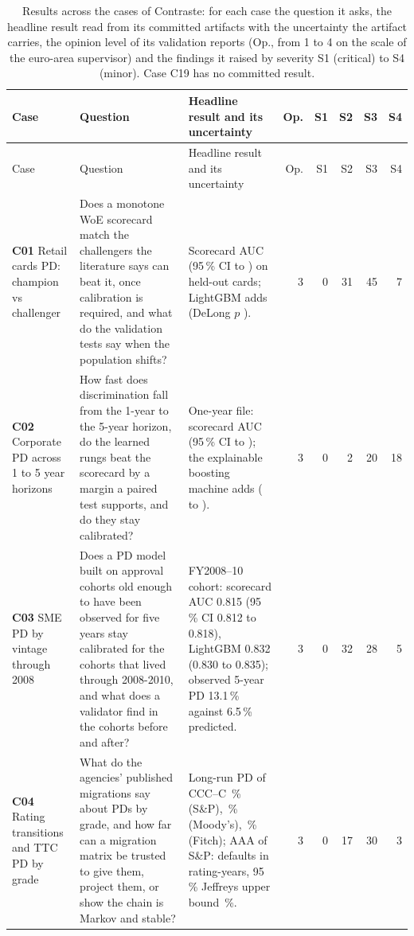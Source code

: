 {\footnotesize
\setlength{\tabcolsep}{3pt}
\renewcommand{\arraystretch}{1.12}
\begin{longtable}{>{\raggedright\arraybackslash}p{2.6cm}>{\raggedright\arraybackslash}p{3.7cm}>{\raggedright\arraybackslash}p{5.7cm}rrrrr}
\caption{Results across the cases of Contraste: for each case the question it asks, the headline result read from its committed artifacts with the uncertainty the artifact carries, the opinion level of its validation reports (Op., from 1 to 4 on the scale of the euro-area supervisor) and the findings it raised by severity S1 (critical) to S4 (minor). Case C19 has no committed result.}\label{tab:results-summary}\\
\toprule
Case & Question & Headline result and its uncertainty & Op. & S1 & S2 & S3 & S4 \\
\midrule
\endfirsthead
\toprule
Case & Question & Headline result and its uncertainty & Op. & S1 & S2 & S3 & S4 \\
\midrule
\endhead
\bottomrule
\endfoot
\textbf{C01} Retail cards PD: champion vs challenger & Does a monotone WoE scorecard match the challengers the literature says can beat it, once calibration is required, and what do the validation tests say when the population shifts? & Scorecard AUC \csHoScAuc{} (95\,\% CI \csHoScAucLo{} to \csHoScAucHi{}) on \csHoN{} held-out cards; LightGBM adds \csHoLgDlDiff{} (DeLong $p$ \csHoLgDlP{}). & 3 & 0 & 31 & 45 & 7 \\
\textbf{C02} Corporate PD across 1 to 5 year horizons & How fast does discrimination fall from the 1-year to the 5-year horizon, do the learned rungs beat the scorecard by a margin a paired test supports, and do they stay calibrated? & One-year file: scorecard AUC \csCtwoAScAuc{} (95\,\% CI \csCtwoAScAucLo{} to \csCtwoAScAucHi{}); the explainable boosting machine adds \csCtwoAEbDiff{} (\csCtwoAEbDiffLo{} to \csCtwoAEbDiffHi{}). & 3 & 0 & 2 & 20 & 18 \\
\textbf{C03} SME PD by vintage through 2008 & Does a PD model built on approval cohorts old enough to have been observed for five years stay calibrated for the cohorts that lived through 2008-2010, and what does a validator find in the cohorts before and after? & FY2008--10 cohort: scorecard AUC 0.815 (95\,\% CI 0.812 to 0.818), LightGBM 0.832 (0.830 to 0.835); observed 5-year PD 13.1\,\% against 6.5\,\% predicted. & 3 & 0 & 32 & 28 & 5 \\
\textbf{C04} Rating transitions and TTC PD by grade & What do the agencies' published migrations say about PDs by grade, and how far can a migration matrix be trusted to give them, project them, or show the chain is Markov and stable? & Long-run PD of CCC--C \rtgLraSpCCCC{}\,\% (S\&P), \rtgLraMoodysCCCC{}\,\% (Moody's), \rtgLraFitchCCCC{}\,\% (Fitch); AAA of S\&P: \rtgLradSpAAA{} defaults in \rtgLranSpAAA{} rating-years, 95\,\% Jeffreys upper bound \rtgJeffupSpAAA{}\,\%. & 3 & 0 & 17 & 30 & 3 \\

\end{longtable}}
